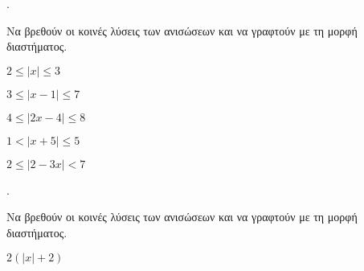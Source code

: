 \documentclass[11pt,a4paper,twocolumn]{article}
\newcounter{askhsh}
\newcommand{\askhsh}{{\large\theaskhsh.}\ \addtocounter{askhsh}{1}}
\begin{document}
\askhsh Να βρεθούν οι κοινές λύσεις των ανισώσεων και να γραφτούν με τη μορφή διαστήματος.
\begin{multicols}{2}
\begin{alist}
\item $ 2\leq\left|x\right|\leq3 $
\item $ 3\leq\left|x-1\right|\leq7 $
\item $4\leq\left|2x-4\right|\leq8 $
\item $1<\left|x+5\right|\leq5 $
\item $2\leq\left|2-3x\right|<7 $
\end{alist}
\end{multicols}
\askhsh Να βρεθούν οι κοινές λύσεις των ανισώσεων και να γραφτούν με τη μορφή διαστήματος.
\begin{multicols}{2}
\begin{alist}
\item $ 2\left( \left|x\right|+2\right) $
\end{alist}
\end{multicols}
\end{document}
